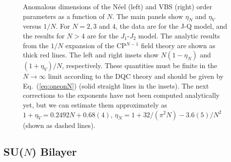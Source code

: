 \documentclass[range]{ar2e}
\begin{document}
\begin{figure}
\centerline{}
 \caption{ \label{fig:exp} Anomalous dimensions of the N\'eel (left) and VBS (right)
  order parameters as a function of $N$. The main panels show $\eta_N$ and $\eta_V$ versus $1/N$. For $N=2,3$ and $4$, the data are 
  for the J-Q model, and the results for $N>4$ are for the $J_1$-$J_2$ model. The analytic results 
  from the $1/N$ expansion of the CP$^{N-1}$ field theory are shown as thick red lines. The left and right insets 
  show $N(1-\eta_N)$ and $(1+\eta_V)/N$, respectively. These quantities must be finite in the  $N\rightarrow \infty$ 
  limit according to the DQC theory and should be given by Eq.~(\ref{eq:oneonN}) (solid straight lines in the insets). 
  The next corrections to the exponents have not been computed analytically yet, but we can estimate them approximately 
  as $1+\eta_V = 0.2492 N + 0.68(4)$, $\eta_N = 1+32/(\pi^2 N)-3.6(5)/N^2$ (shown as dashed lines).}
\end{figure}

\subsection{SU($N$) Bilayer}
\label{ss:bilN}
\end{document}
